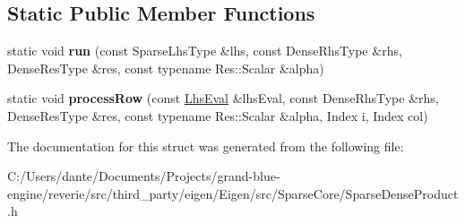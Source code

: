 \subsection*{Static Public Member Functions}
\begin{DoxyCompactItemize}
\item 
\mbox{\label{struct_eigen_1_1internal_1_1sparse__time__dense__product__impl_3_01_sparse_lhs_type_00_01_dense_b414480199bc806c66dca70961af5e2d_ad84ea1f91d62e9274500d41413e4ad45}} 
static void {\bfseries run} (const Sparse\+Lhs\+Type \&lhs, const Dense\+Rhs\+Type \&rhs, Dense\+Res\+Type \&res, const typename Res\+::\+Scalar \&alpha)
\item 
\mbox{\label{struct_eigen_1_1internal_1_1sparse__time__dense__product__impl_3_01_sparse_lhs_type_00_01_dense_b414480199bc806c66dca70961af5e2d_a9213297be151113b8afbf6971f85e65c}} 
static void {\bfseries process\+Row} (const \mbox{\hyperlink{struct_eigen_1_1internal_1_1evaluator}{Lhs\+Eval}} \&lhs\+Eval, const Dense\+Rhs\+Type \&rhs, Dense\+Res\+Type \&res, const typename Res\+::\+Scalar \&alpha, Index i, Index col)
\end{DoxyCompactItemize}


The documentation for this struct was generated from the following file\+:\begin{DoxyCompactItemize}
\item 
C\+:/\+Users/dante/\+Documents/\+Projects/grand-\/blue-\/engine/reverie/src/third\+\_\+party/eigen/\+Eigen/src/\+Sparse\+Core/Sparse\+Dense\+Product.\+h\end{DoxyCompactItemize}
